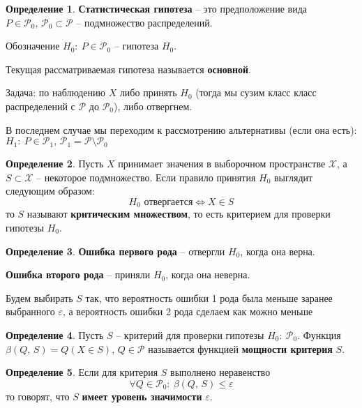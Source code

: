 \documentclass[a4paper,12pt]{article}
\renewcommand{\leq}{\ensuremath{\leqslant}}
\theoremstyle{plain}
\theoremstyle{definition}
\newtheorem{definition}{Определение}[section]
\theoremstyle{remark}
\begin{document}
\begin{definition}
  \textbf{Статистическая гипотеза} -- это предположение вида $P \in \mathcal{P}_0,\, \mathcal{P}_0 \subset \mathcal{P}$ -- подмножество распределений.

  Обозначение $H_0 :\: P \in \mathcal{P}_0$ -- гипотеза $H_0$.

  Текущая рассматриваемая гипотеза называется \textbf{основной}.
\end{definition}

Задача: по наблюдению $X$ либо принять $H_0$ (тогда мы сузим класс класс распределений с $\mathcal{P}$ до $\mathcal{P}_0$), либо отвергнем.

В последнем случае мы переходим к рассмотрению альтернативы (если она есть): $H_1 :\: P \in \mathcal{P}_1,\, \mathcal{P}_1 = \mathcal{P} \setminus \mathcal{P}_0$

\begin{definition}
  Пусть $X$ принимает значения в выборочном пространстве $\mathcal{X}$, а $S \subset \mathcal{X}$ -- некоторое подмножество. Если правило принятия $H_0$ выглядит следующим образом:
  \[
    H_0 \text{ отвергается} \Leftrightarrow X \in S
  \]
  то $S$ называют \textbf{критическим множеством}, то есть критерием для проверки гипотезы $H_0$.
\end{definition}

\begin{definition}
  \textbf{Ошибка первого рода} -- отвергли $H_0$, когда она верна.

  \textbf{Ошибка второго рода} -- приняли $H_0$, когда она неверна.
\end{definition}

Будем выбирать $S$ так, что вероятность ошибки 1 рода была меньше заранее выбранного $\varepsilon$, а вероятность ошибки 2 рода сделаем как можно меньше

\begin{definition}
  Пусть $S$ -- критерий для проверки гипотезы $H_0 :\: \mathcal{P}_0$. Функция $\beta(Q,\,S) = Q(X \in S),\, Q \in \mathcal{P}$ называется функцией \textbf{мощности критерия} $S$.
\end{definition}

\begin{definition}
  Если для критерия $S$ выполнено неравенство 
  \[
    \forall Q \in \mathcal{P}_0 :\: \beta(Q,\, S) \leq \varepsilon
  \]
  то говорят, что $S$ \textbf{имеет уровень значимости} $\varepsilon$.
\end{definition}
\end{document}
